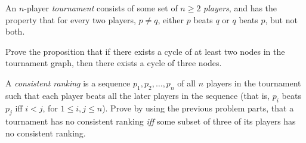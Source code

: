 \documentclass[12pt,oneside]{article}
\begin{document}
\begin{problem}{15}

An $n$-player \emph{tournament} consists of some set of $n\geq 2$
\emph{players}, and has the property that for every two players, $p \neq
q$, either $p$ beats $q$ or $q$ beats $p$, but not both.  



\begin{problemparts}

 Prove the proposition that if there exists a cycle of at least two nodes in the tournament graph, then there exists a cycle of three nodes.


 A {\em consistent ranking} is a sequence $p_1,p_2, \ldots,
p_n$ of all $n$ players in the tournament such that each player beats all
the later players in the sequence (that is, $p_i$ beats $p_j$ iff $i < j$,
for $1 \leq i,j \leq n$). Prove by using the previous problem parts, that a tournament has no consistent ranking \textit{iff} some subset of three of its players has no consistent ranking.

\end{problemparts}

\end{problem}
\end{document}
